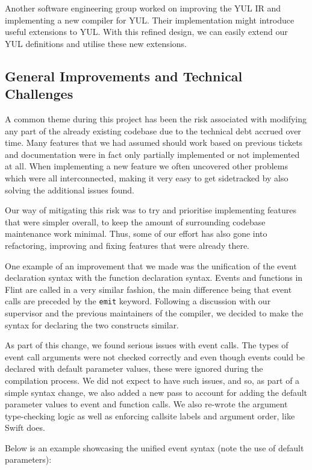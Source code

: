 Another software engineering group worked on improving the YUL IR and implementing a new compiler for YUL. Their implementation might introduce useful extensions to YUL. With this refined design, we can easily extend our YUL definitions and utilise these new extensions.

\subsection{General Improvements and Technical Challenges}

A common theme during this project has been the risk associated with modifying any part of the already existing codebase due to the technical debt accrued over time. Many features that we had assumed should work based on previous tickets and documentation were in fact only partially implemented or not implemented at all. When implementing a new feature we often uncovered other problems which were all interconnected, making it very easy to get sidetracked by also solving the additional issues found.

Our way of mitigating this risk was to try and prioritise implementing features that were simpler overall, to keep the amount of surrounding codebase maintenance work minimal.  Thus, some of our effort has also gone into refactoring, improving and fixing features that were already there.

One example of an improvement that we made was the unification of the event declaration syntax with the function declaration syntax. Events and functions in Flint are called in a very similar fashion, the main difference being that event calls are preceded by the \texttt{emit} keyword. Following a discussion with our supervisor and the previous maintainers of the compiler, we decided to make the syntax for declaring the two constructs similar.

As part of this change, we found serious issues with event calls. The types of event call arguments were not checked correctly and even though events could be declared with default parameter values, these were ignored during the compilation process. We did not expect to have such issues, and so, as part of a simple syntax change, we also added a new pass to account for adding the default parameter values to event and function calls. We also re-wrote the argument type-checking logic as well as enforcing callsite labels and argument order, like Swift does.

Below is an example showcasing the unified event syntax (note the use of default parameters):


